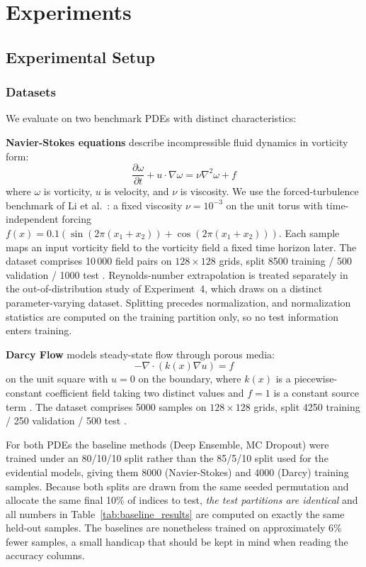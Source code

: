 \section{Experiments}
\label{sec:results}

\subsection{Experimental Setup}

\subsubsection{Datasets}

We evaluate on two benchmark PDEs with distinct characteristics:

\textbf{Navier-Stokes equations} describe incompressible fluid dynamics in vorticity form:
\begin{equation}
    \frac{\partial \omega}{\partial t} + u \cdot \nabla \omega = \nu \nabla^2 \omega + f
\end{equation}
where $\omega$ is vorticity, $u$ is velocity, and $\nu$ is viscosity. We use the forced-turbulence benchmark of
Li et al.~\cite{li2020fourier}: a fixed viscosity $\nu = 10^{-3}$ on the unit torus with time-independent
forcing $f(x) = 0.1\left(\sin(2\pi(x_1{+}x_2)) + \cos(2\pi(x_1{+}x_2))\right)$. Each sample maps an input
vorticity field to the vorticity field a fixed time horizon later. The dataset comprises 10\,000 field pairs on
$128 \times 128$ grids, split 8500 training / 500 validation / 1000 test \cite{ns_dataset_zenodo}. Reynolds-number
extrapolation is treated separately in the out-of-distribution study of Experiment~4, which draws on a distinct
parameter-varying dataset. Splitting precedes normalization, and normalization statistics are computed on the
training partition only, so no test information enters training.

\textbf{Darcy Flow} models steady-state flow through porous media:
\begin{equation}
    -\nabla \cdot (k(x) \nabla u) = f
\end{equation}
on the unit square with $u = 0$ on the boundary, where $k(x)$ is a piecewise-constant coefficient field taking
two distinct values and $f = 1$ is a constant source term \cite{li2020fourier}. The dataset comprises 5000
samples on $128 \times 128$ grids, split 4250 training / 250 validation / 500 test \cite{darcy_dataset_zenodo}.

For both PDEs the baseline methods (Deep Ensemble, MC Dropout) were trained under an 80/10/10 split rather
than the 85/5/10 split used for the evidential models, giving them 8000 (Navier-Stokes) and 4000 (Darcy)
training samples. Because both splits are drawn from the same seeded permutation and allocate the same final
10\% of indices to test, \emph{the test partitions are identical} and all numbers in
Table~\ref{tab:baseline_results} are computed on exactly the same held-out samples. The baselines are
nonetheless trained on approximately 6\% fewer samples, a small handicap that should be kept in mind when
reading the accuracy columns.

